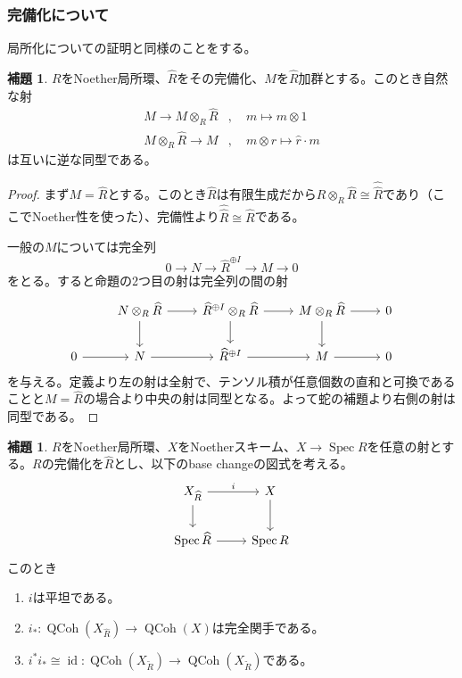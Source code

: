 \documentclass[uplatex, a4paper, dvipdfmx]{jsarticle}
\theoremstyle{definition}
\newtheorem{lemma}[theorem]{補題}
\DeclareMathOperator{\id}{\mathrm{id}}
\DeclareMathOperator{\Spec}{\mathrm{Spec}}
\DeclareMathOperator{\QCoh}{\mathrm{QCoh}}
\begin{document}
\subsubsection{完備化について}
局所化についての証明と同様のことをする。
\begin{lemma}\label{lem:forget-and-extension}
    $R$をNoether局所環、$\widehat{R}$をその完備化、$M$を$\widehat{R}$加群とする。このとき自然な射
    \begin{align}
        M \to M \otimes_R \widehat{R} & ,\quad m \mapsto m \otimes 1                    \\
        M \otimes_R \widehat{R} \to M & ,\quad m \otimes \hat{r} \mapsto \hat{r}\cdot m
    \end{align}
    は互いに逆な同型である。
\end{lemma}
\begin{proof}
    まず$M = \widehat{R}$とする。このとき$\widehat{R}$は有限生成だから$\widehat{R} \otimes_R \widehat{R}\cong \widehat{\widehat{R}}$であり（ここでNoether性を使った）、完備性より$\widehat{\widehat{R}} \cong \widehat{R}$である。

    一般の$M$については完全列
    \begin{equation}
        0 \to N \to \widehat{R}^{\oplus I} \to M \to 0
    \end{equation}
    をとる。すると命題の2つ目の射は完全列の間の射
    \[
        \begin{tikzcd}
            &N \otimes_R \widehat{R} \ar[r]\ar[d]& \widehat{R}^{\oplus I} \otimes_R \widehat{R} \ar[r]\ar[d]& M \otimes_R \widehat{R} \ar[r]\ar[d]& 0\\
            0 \ar[r] &N \ar[r] & \widehat{R}^{\oplus I}  \ar[r] & M  \ar[r] & 0
        \end{tikzcd}
    \]
    を与える。定義より左の射は全射で、テンソル積が任意個数の直和と可換であることと$M = \widehat{R}$の場合より中央の射は同型となる。よって蛇の補題より右側の射は同型である。
\end{proof}
\begin{lemma}
    $R$をNoether局所環、$X$をNoetherスキーム、$X \to \Spec R$を任意の射とする。$R$の完備化を$\widehat{R}$とし、以下のbase changeの図式を考える。
    \[
        \begin{tikzcd}
            X_{\widehat{R}} \ar[r, "i"] \ar[d]& X \ar[d]\\
            \Spec \widehat{R} \ar[r]& \Spec R
        \end{tikzcd}
    \]
    このとき
    \begin{enumerate}
        \item $i$は平坦である。
        \item $i_* \colon \QCoh(X_{\widehat{R}}) \to \QCoh(X)$は完全関手である。
        \item $i^*i_* \cong \id \colon \QCoh(X_{\widetilde{R}}) \to  \QCoh(X_{\widetilde{R}})$である。
    \end{enumerate}
\end{lemma}
\end{document}
